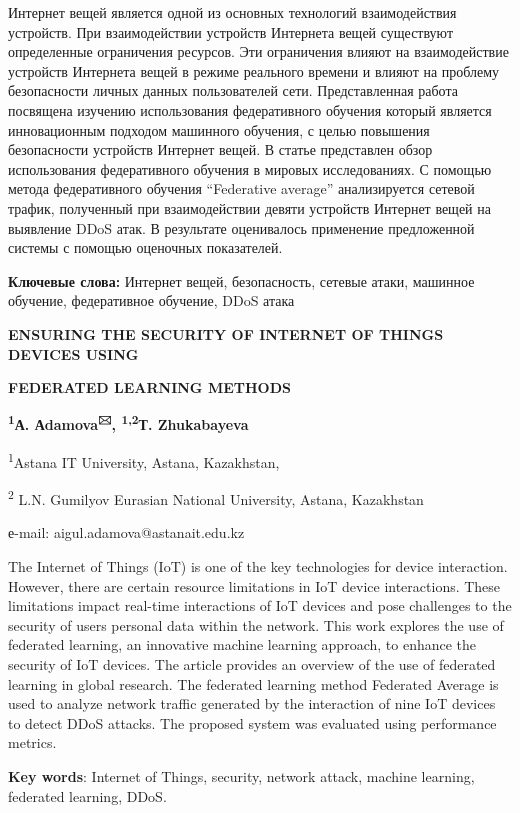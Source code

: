 Интернет вещей является одной из основных технологий взаимодействия
устройств. При взаимодействии устройств Интернета вещей существуют
определенные ограничения ресурсов. Эти ограничения влияют на
взаимодействие устройств Интернета вещей в режиме реального времени и
влияют на проблему безопасности личных данных пользователей сети.
Представленная работа посвящена изучению использования федеративного
обучения который является инновационным подходом машинного обучения, с
целью повышения безопасности устройств Интернет вещей. В статье
представлен обзор использования федеративного обучения в мировых
исследованиях. С помощью метода федеративного обучения ``Federative
average'' анализируется сетевой трафик, полученный при взаимодействии
девяти устройств Интернет вещей на выявление DDoS атак. В результате
оценивалось применение предложенной системы с помощью оценочных
показателей.

{\bfseries Ключевые слова:} Интернет вещей, безопасность, сетевые атаки,
машинное обучение, федеративное обучение, DDoS атака

{\bfseries ENSURING THE SECURITY OF INTERNET OF THINGS DEVICES USING}

{\bfseries FEDERATED LEARNING METHODS}

{\bfseries \textsuperscript{1}А. Аdamova\textsuperscript{🖂},
\textsuperscript{1,2}Т. Zhukabayeva}

\textsuperscript{1}Astana IT University, Astana, Kazakhstan,

\textsuperscript{2} L.N. Gumilyov Eurasian National University, Astana,
Kazakhstan

е-mail: aigul.adamova@astanait.edu.kz

The Internet of Things (IoT) is one of the key technologies for device
interaction. However, there are certain resource limitations in IoT
device interactions. These limitations impact real-time interactions of
IoT devices and pose challenges to the security of
users\textquotesingle{} personal data within the network. This work
explores the use of federated learning, an innovative machine learning
approach, to enhance the security of IoT devices. The article provides
an overview of the use of federated learning in global research. The
federated learning method \textquotesingle Federated
Average\textquotesingle{} is used to analyze network traffic generated
by the interaction of nine IoT devices to detect DDoS attacks. The
proposed system was evaluated using performance metrics.

{\bfseries Key words}: Internet of Things, security, network attack,
machine learning, federated learning, DDoS.

